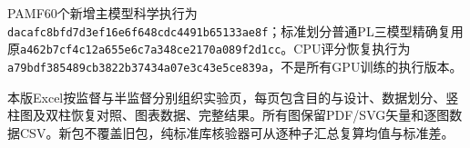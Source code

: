 \documentclass[10pt,journal]{IEEEtran}
\begin{document}
PAMF60个新增主模型科学执行为\nolinkurl{dacafc8bfd7d3ef16e6f648cdc4491b65133ae8f}；标准划分普通PL三模型精确复用原\nolinkurl{a462b7cf4c12a655e6c7a348ce2170a089f2d1cc}。CPU评分恢复执行为\nolinkurl{a79bdf385489cb3822b37434a07e3c43e5ce839a}，不是所有GPU训练的执行版本。

本版Excel按监督与半监督分别组织实验页，每页包含目的与设计、数据划分、竖柱图及双柱恢复对照、图表数据、完整结果。所有图保留PDF/SVG矢量和逐图数据CSV。新包不覆盖旧包，纯标准库核验器可从逐种子汇总复算均值与标准差。

\FloatBarrier
\end{document}
